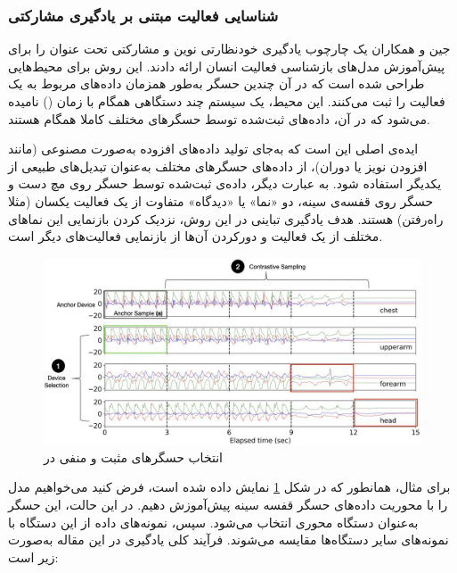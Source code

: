 \subsubsection{شناسایی فعالیت مبتنی بر یادگیری مشارکتی}

جین و همکاران \cite{jain2022collossl} یک چارچوب یادگیری خودنظارتی نوین و مشارکتی تحت عنوان  را برای پیش‌آموزش مدل‌های بازشناسی فعالیت انسان ارائه دادند. این روش برای محیط‌هایی طراحی شده است که در آن چندین حسگر به‌طور همزمان داده‌های مربوط به یک فعالیت را ثبت می‌کنند. این محیط، یک سیستم چند دستگاهی همگام با زمان () نامیده می‌شود که در آن، داده‌های ثبت‌شده توسط حسگرهای مختلف کاملا همگام هستند.

ایده‌ی اصلی  این است که به‌جای تولید داده‌های افزوده به‌صورت مصنوعی (مانند افزودن نویز یا دوران)، از داده‌های حسگرهای مختلف به‌عنوان تبدیل‌های طبیعی  از یکدیگر استفاده شود. به عبارت دیگر، داده‌ی ثبت‌شده توسط حسگر روی مچ دست و حسگر روی قفسه‌ی سینه، دو «نما» یا «دیدگاه» متفاوت از یک فعالیت یکسان (مثلا راه‌رفتن) هستند. هدف یادگیری تباینی در این روش، نزدیک کردن بازنمایی این نماهای مختلف از یک فعالیت و دورکردن آن‌ها از بازنمایی فعالیت‌های دیگر است.

\begin{figure}[t]
\centering
\includegraphics[width=1\textwidth]{Images/Chapter2/collossl.png}
\caption{انتخاب حسگرهای مثبت و منفی در }

\label{fig:collossl}

\end{figure}

برای مثال، همانطور که در شکل \ref{fig:collossl} نمایش داده شده است، فرض کنید می‌خواهیم مدل را با محوریت داده‌های حسگر قفسه سینه پیش‌آموزش دهیم. در این حالت، این حسگر به‌عنوان دستگاه محوری  انتخاب می‌شود. سپس، نمونه‌های داده از این دستگاه با نمونه‌های سایر دستگاه‌ها مقایسه می‌شوند. فرآیند کلی یادگیری در این مقاله به‌صورت زیر است:


